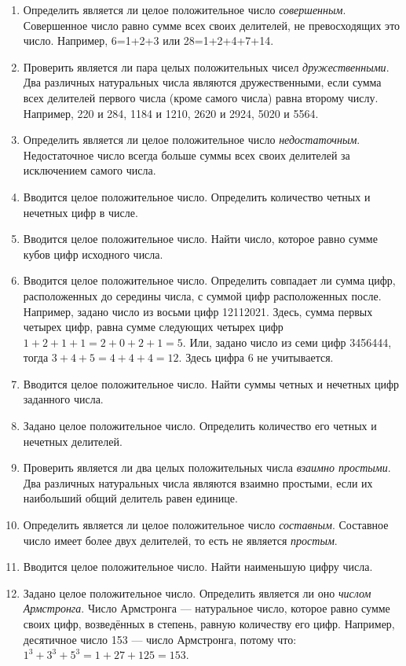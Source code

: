 \begin{enumerate}
\item Определить является ли целое положительное число \emph{совершенным}. Совершенное число равно сумме
всех своих делителей, не превосходящих это число. Например, 6=1+2+3 или 28=1+2+4+7+14.
\item Проверить является ли пара целых положительных чисел \emph{дружественными}. Два различных натуральных
числа являются дружественными, если сумма всех делителей первого числа (кроме самого числа) равна второму числу.
Например, 220 и 284, 1184 и 1210, 2620 и 2924, 5020 и 5564.
\item Определить является ли целое положительное число \emph{недостаточным}. Недостаточное число всегда
больше суммы всех своих делителей за исключением самого числа.
\item Вводится целое положительное число. Определить количество четных и нечетных цифр в числе.
\item Вводится целое положительное число. Найти число, которое равно сумме кубов цифр исходного числа.
\item Вводится целое положительное число. Определить совпадает ли сумма цифр, 
расположенных до середины числа, с суммой цифр расположенных после. Например, задано число из восьми 
цифр 12112021. Здесь, сумма первых четырех цифр, равна сумме следующих четырех цифр $1+2+1+1=2+0+2+1=5$. 
Или, задано число из семи цифр 3456444, тогда $3+4+5=4+4+4=12$. Здесь цифра 6 не учитывается.
\item Вводится целое положительное число. Найти суммы четных и нечетных цифр заданного числа.
\item Задано целое положительное число. Определить количество его четных и нечетных делителей.
\item Проверить является ли два целых положительных числа \emph{взаимно простыми}. Два различных
натуральных числа являются взаимно простыми, если их наибольший общий делитель равен единице.
\item Определить является ли целое положительное число \emph{составным}. Составное число имеет более двух
делителей, то есть не является \emph{простым}.
\item Вводится целое положительное число. Найти наименьшую цифру числа.
\item Задано целое положительное число. Определить является ли оно \emph{числом Армстронга}. Число
Армстронга --- натуральное число, которое равно сумме своих цифр, возведённых в степень, равную количеству его цифр.
Например, десятичное число 153 --- число Армстронга, потому что:  $1^3+3^3+5^3=1+27+125=153$.

\end{enumerate}
